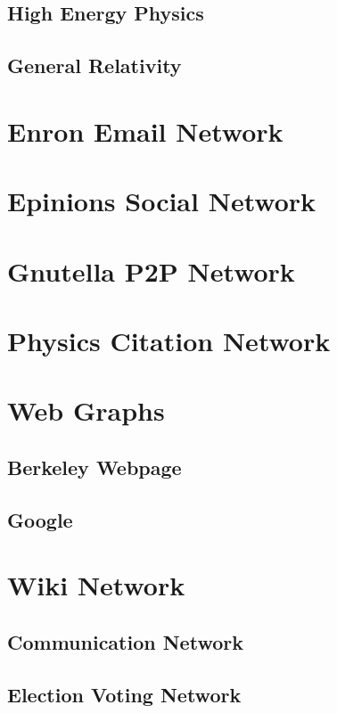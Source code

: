 \documentclass[phd,tocprelim]{cornell}
\begin{document}
\subsection{High Energy Physics}

\subsection{General Relativity}



\section{Enron Email Network}

\section{Epinions Social Network}

\section{Gnutella P2P Network}

\section{Physics Citation Network}

\section{Web Graphs}

\subsection{Berkeley Webpage}

\subsection{Google}


\section{Wiki Network}

\subsection{Communication Network}

\subsection{Election Voting Network}
\end{document}
